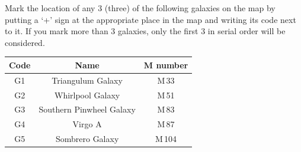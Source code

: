 Mark the location of any 3 (three) of the following galaxies on the map by
putting a `+' sign at the appropriate place in the map and writing its code
next to it. If you mark more than 3 galaxies, only the first 3 in serial order
will be considered.

\begin{center}
\begin{tabular}{ccc}
Code & Name & M number \\
\hline
G1 & Triangulum Galaxy & M\,33 \\
G2 & Whirlpool Galaxy & M\,51 \\
G3 & Southern Pinwheel Galaxy & M\,83 \\
G4 & Virgo A & M\,87 \\
G5 & Sombrero Galaxy & M\,104 \\
\end{tabular}
\end{center}

